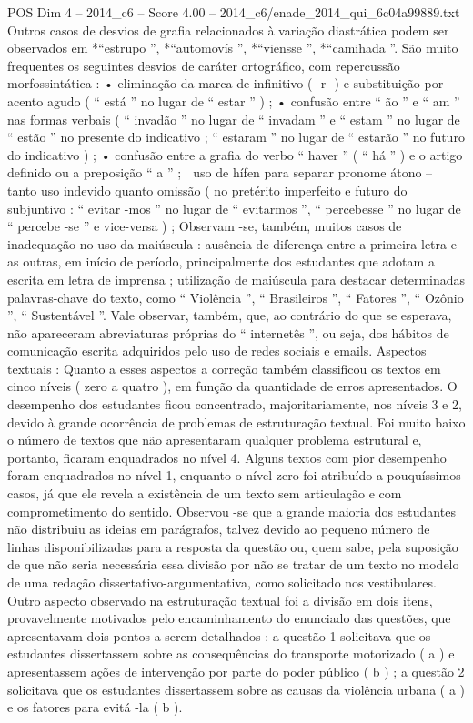\begin{textsample}{POS Dim 4 – 2014\_c6 – Score 4.00 – 2014\_c6/enade\_2014\_qui\_6c04a99889.txt}
Outros casos de desvios de grafia relacionados à variação diastrática podem ser observados em *“estrupo ”, *“automovís ”, *“viensse ”, *“camihada ”.
São muito frequentes os seguintes desvios de caráter ortográfico, com repercussão morfossintática : • eliminação da marca de infinitivo ( -r- ) e substituição por acento agudo ( “ está ” no lugar de “ estar ” ) ; • confusão entre “ ão ” e “ am ” nas formas verbais ( “ invadão ” no lugar de “ invadam ” e “ estam ” no lugar de “ estão ” no presente do indicativo ; “ estaram ” no lugar de “ estarão ” no futuro do indicativo ) ; • confusão entre a grafia do verbo “ haver ” ( “ há ” ) e o artigo definido ou a preposição “ a ” ;  uso de hífen para separar pronome átono – tanto uso indevido quanto omissão ( no pretérito imperfeito e futuro do subjuntivo : “ evitar -mos ” no lugar de “ evitarmos ”, “ percebesse ” no lugar de “ percebe -se ” e vice-versa ) ; Observam -se, também, muitos casos de inadequação no uso da maiúscula : ausência de diferença entre a primeira letra e as outras, em início de período, principalmente dos estudantes que adotam a escrita em letra de imprensa ; utilização de maiúscula para destacar determinadas palavras-chave do texto, como “ Violência ”, “ Brasileiros ”, “ Fatores ”, “ Ozônio ”, “ Sustentável ”.
Vale observar, também, que, ao contrário do que se esperava, não apareceram abreviaturas próprias do “ internetês ”, ou seja, dos hábitos de comunicação escrita adquiridos pelo uso de redes sociais e emails.
Aspectos textuais : Quanto a esses aspectos a correção também classificou os textos em cinco níveis ( zero a quatro ), em função da quantidade de erros apresentados.
O desempenho dos estudantes ficou concentrado, majoritariamente, nos níveis 3 e 2, devido à grande ocorrência de problemas de estruturação textual.
Foi muito baixo o número de textos que não apresentaram qualquer problema estrutural e, portanto, ficaram enquadrados no nível 4.
Alguns textos com pior desempenho foram enquadrados no nível 1, enquanto o nível zero foi atribuído a pouquíssimos casos, já que ele revela a existência de um texto sem articulação e com comprometimento do sentido.
Observou -se que a grande maioria dos estudantes não distribuiu as ideias em parágrafos, talvez devido ao pequeno número de linhas disponibilizadas para a resposta da questão ou, quem sabe, pela suposição de que não seria necessária essa divisão por não se tratar de um texto no modelo de uma redação dissertativo-argumentativa, como solicitado nos vestibulares.
Outro aspecto observado na estruturação textual foi a divisão em dois itens, provavelmente motivados pelo encaminhamento do enunciado das questões, que apresentavam dois pontos a serem detalhados : a questão 1 solicitava que os estudantes dissertassem sobre as consequências do transporte motorizado ( a ) e apresentassem ações de intervenção por parte do poder público ( b ) ; a questão 2 solicitava que os estudantes dissertassem sobre as causas da violência urbana ( a ) e os fatores para evitá -la ( b ).

\end{textsample}
